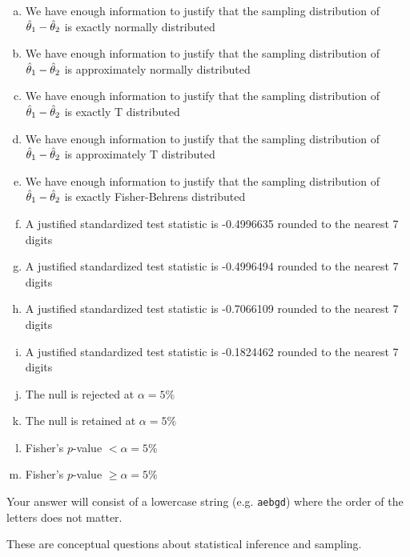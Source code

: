\documentclass[12pt,landscape]{article}
\newcommand{\instr}{\small Your answer will consist of a lowercase string (e.g. \texttt{aebgd}) where the order of the letters does not matter. \normalsize}
\begin{document}
\begin{enumerate}[(a)]
\item We have enough information to justify that the sampling distribution of $\hat{\theta}_1 - \hat{\theta}_2$ is exactly normally distributed
\item We have enough information to justify that the sampling distribution of $\hat{\theta}_1 - \hat{\theta}_2$ is approximately normally distributed
\item We have enough information to justify that the sampling distribution of $\hat{\theta}_1 - \hat{\theta}_2$ is exactly T distributed
\item We have enough information to justify that the sampling distribution of $\hat{\theta}_1 - \hat{\theta}_2$ is approximately T distributed
\item We have enough information to justify that the sampling distribution of $\hat{\theta}_1 - \hat{\theta}_2$ is exactly Fisher-Behrens distributed

\item A justified standardized test statistic is -0.4996635 rounded to the nearest 7 digits %
\item A justified standardized test statistic is -0.4996494 rounded to the nearest 7 digits 
\item A justified standardized test statistic is -0.7066109 rounded to the nearest 7 digits
\item A justified standardized test statistic is -0.1824462 rounded to the nearest 7 digits

\item The null is rejected at $\alpha = 5\%$
\item The null is retained at $\alpha = 5\%$

\item Fisher's $p$-value $ < \alpha = 5\%$
\item Fisher's $p$-value $ \geq \alpha = 5\%$
\end{enumerate}
\eenum\instr\pagebreak

\problem{} These are conceptual questions about statistical inference and sampling.
\end{document}
